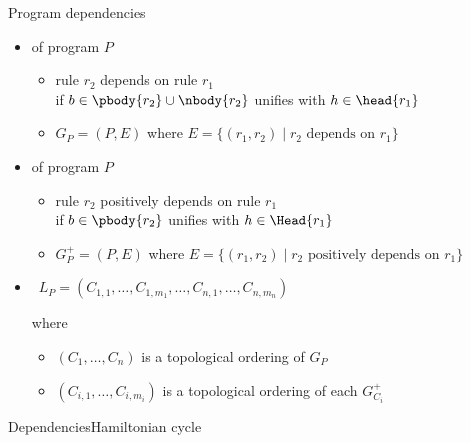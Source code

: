 \begin{frame}{Program dependencies}
  \smallskip
  \begin{itemize}
  \item<1->  of program \(P\)
    \begin{itemize}\normalsize
    \item rule \(r_2\) \alert{depends} on rule \(r_1\)\\ if \(b\in\pbody{r_2}\cup\nbody{r_2}\) unifies with \(h\in\head{r_1}\)
      \smallskip
    \item \(G_P=(P,E)\) where \(E=\{ (r_1,r_2) \mid r_2 \mbox{ depends on } r_1 \}\)
    \end{itemize}
    \medskip
  \item<2->  of program \(P\)
    \begin{itemize}\normalsize
    \item rule \(r_2\) \alert{positively depends} on rule \(r_1\)\\ if \(b\in\pbody{r_2}\) unifies with \(h\in\Head{r_1}\)
      \smallskip
    \item \(G^+_P=(P,E)\) where \(E=\{ (r_1,r_2) \mid r_2 \mbox{ positively depends on } r_1 \}\)
    \end{itemize}
    \medskip
  \item<3->  \  \(L_P = (C_{1,1},\dots,C_{1,m_1},\dots,C_{n,1},\dots,C_{n,m_n})\)
    \par
    where
    \begin{itemize}\normalsize
    \item \((C_1,\dots,C_n)\) is a topological ordering of \(G_P\)
      \smallskip
    \item \((C_{i,1},\dots,C_{i,m_i})\) is a topological ordering of each \(G^+_{C_i}\)
    \end{itemize}
  \end{itemize}
\end{frame}
\begin{frame}[shrink]{Dependencies}{Hamiltonian cycle}
  \begin{center}
  \DepGraph
  \end{center}
\end{frame}
